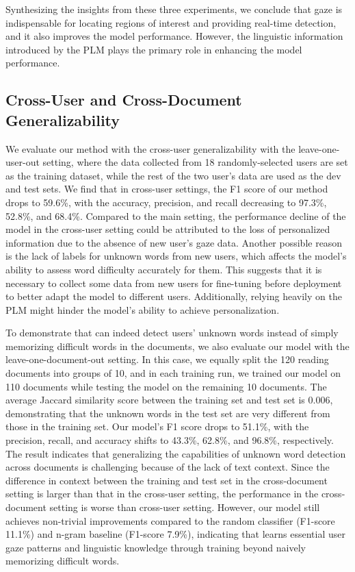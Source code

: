 Synthesizing the insights from these three experiments, we conclude that gaze is indispensable for locating regions of interest and providing real-time detection, and it also improves the model performance. However, the linguistic information introduced by the PLM plays the primary role in enhancing the model performance.

\subsection{Cross-User and Cross-Document Generalizability}
\label{sec:cross-user}
We evaluate our method with the cross-user generalizability with the leave-one-user-out setting, where the data collected from 18 randomly-selected users are set as the training dataset, while the rest of the two user's data are used as the dev and test sets. We find that in cross-user settings, the F1 score of our method drops to 59.6\%, with the accuracy, precision, and recall decreasing to 97.3\%, 52.8\%, and 68.4\%. Compared to the main setting, the performance decline of the model in the cross-user setting could be attributed to the loss of personalized information due to the absence of new user's gaze data. Another possible reason is the lack of labels for unknown words from new users, which affects the model's ability to assess word difficulty accurately for them. This suggests that it is necessary to collect some data from new users for fine-tuning before deployment to better adapt the model to different users. Additionally, relying heavily on the PLM might hinder the model's ability to achieve personalization.


To demonstrate that \name{} can indeed detect users' unknown words instead of simply memorizing difficult words in the documents, we also evaluate our model with the leave-one-document-out setting. In this case, we equally split the 120 reading documents into groups of 10, and in each training run, we trained our model on 110 documents while testing the model on the remaining 10 documents. The average Jaccard similarity score between the training set and test set is 0.006, demonstrating that the unknown words in the test set are very different from those in the training set. Our model's F1 score drops to 51.1\%, with the precision, recall, and accuracy shifts to 43.3\%, 62.8\%, and 96.8\%, respectively. The result indicates that generalizing the capabilities of unknown word detection across documents is challenging because of the lack of text context. Since the difference in context between the training and test set in the cross-document setting is larger than that in the cross-user setting, the performance in the cross-document setting is worse than cross-user setting. However, our model still achieves non-trivial improvements compared to the random classifier (F1-score 11.1\%) and n-gram baseline (F1-score 7.9\%), indicating that \name{} learns essential user gaze patterns and linguistic knowledge through training beyond naively memorizing difficult words.

